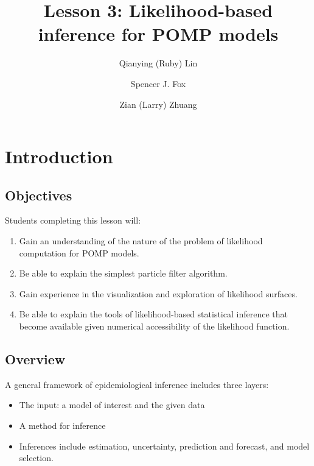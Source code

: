 \documentclass[
  letterpaper,
  DIV=11,
  numbers=noendperiod]{scrartcl}
\title{Lesson 3: Likelihood-based inference for POMP models}
\author{Qianying (Ruby) Lin \and Spencer J. Fox \and Zian (Larry)
Zhuang}
\date{}
\providecommand{\tightlist}{%
  \setlength{\itemsep}{0pt}\setlength{\parskip}{0pt}}\usepackage{longtable,booktabs,array}
\begin{document}
\maketitle
\ifdefined\Shaded\renewenvironment{Shaded}{\begin{tcolorbox}[breakable, enhanced, interior hidden, sharp corners, boxrule=0pt, borderline west={3pt}{0pt}{shadecolor}, frame hidden]}{\end{tcolorbox}}\fi

\hypertarget{introduction}{%
\section{Introduction}\label{introduction}}

\hypertarget{objectives}{%
\subsection{Objectives}\label{objectives}}

Students completing this lesson will:

\begin{enumerate}
\def\labelenumi{\arabic{enumi}.}
\tightlist
\item
  Gain an understanding of the nature of the problem of likelihood
  computation for POMP models.
\item
  Be able to explain the simplest particle filter algorithm.
\item
  Gain experience in the visualization and exploration of likelihood
  surfaces.
\item
  Be able to explain the tools of likelihood-based statistical inference
  that become available given numerical accessibility of the likelihood
  function.
\end{enumerate}

\hypertarget{overview}{%
\subsection{Overview}\label{overview}}

A general framework of epidemiological inference includes three layers:

\begin{itemize}
\tightlist
\item
  The input: a model of interest and the given data
\item
  A method for inference
\item
  Inferences include estimation, uncertainty, prediction and forecast,
  and model selection.
\end{itemize}
\end{document}
